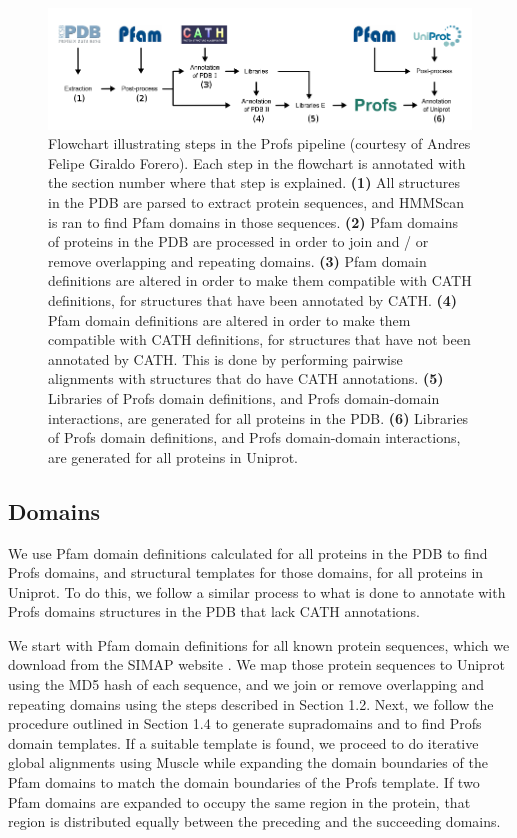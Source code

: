 \begin{figure}[t]
	\centering
	\includegraphics[width=1.0\linewidth]{static/profs/profs_pipeline.png}
	\caption[Flowchart illustrating steps in the Profs pipeline.]{Flowchart illustrating steps in the Profs pipeline (courtesy of Andres Felipe Giraldo Forero). Each step in the flowchart is annotated with the section number where that step is explained. \textbf{(1)} All structures in the PDB are parsed to extract protein sequences, and HMMScan is ran to find Pfam domains in those sequences. \textbf{(2)} Pfam domains of proteins in the PDB are processed in order to join and / or remove overlapping and repeating domains. \textbf{(3)} Pfam domain definitions are altered in order to make them compatible with CATH definitions, for structures that have been annotated by CATH. \textbf{(4)} Pfam domain definitions are altered in order to make them compatible with CATH definitions, for structures that have not been annotated by CATH. This is done by performing pairwise alignments with structures that do have CATH annotations. \textbf{(5)} Libraries of Profs domain definitions, and Profs domain-domain interactions, are generated for all proteins in the PDB.  \textbf{(6)} Libraries of Profs domain definitions, and Profs domain-domain interactions, are generated for all proteins in Uniprot.}
	\label{fig:profs_pipeline}
\end{figure}


\subsection{Domains}

We use Pfam domain definitions calculated for all proteins in the PDB to find Profs domains, and structural templates for those domains, for all proteins in Uniprot. To do this, we follow a similar process to what is done to annotate with Profs domains structures in the PDB that lack CATH annotations.

We start with Pfam domain definitions for all known protein sequences, which we download from the SIMAP website \cite{rattei_simapcomprehensive_2010}. We map those protein sequences to Uniprot using the MD5 hash of each sequence, and we join or remove overlapping and repeating domains using the steps described in Section 1.2. Next, we follow the procedure outlined in Section 1.4 to generate supradomains and to find Profs domain templates. If a suitable template is found, we proceed to do iterative global alignments using Muscle while expanding the domain boundaries of the Pfam domains to match the domain boundaries of the Profs template.  If two Pfam domains are expanded to occupy the same region in the protein, that region is distributed equally between the preceding and the succeeding domains.

